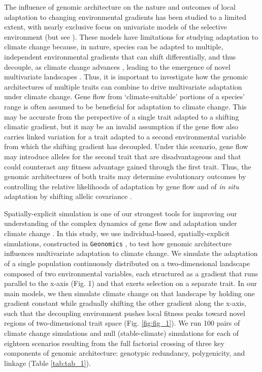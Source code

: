 \documentclass[9pt,twocolumn,twoside,lineno]{new_article}
\begin{document}
The influence of genomic architecture on the nature and outcomes
of local adaptation to changing environmental gradients
has been studied to a limited extent,
with nearly exclusive focus on univariate models
of the selective environment (but see \cite{schiffers}).
These models have limitations for studying adaptation to climate change
because, in nature, species can be adapted to multiple,
independent environmental gradients \cite{guillaume} that can shift differentially,
and thus decouple, as climate change advances
\cite{crimmins,daly},
leading to the emergence of novel multivariate landscapes
\cite{williams_novel_climates,williams_projected_novel_disappearing,fitzpatrick}.
Thus, it is important to investigate how the genomic architectures
of multiple traits can combine to drive multivariate adaptation under climate change.
Gene flow from `climate-suitable' portions of a species' range
is often assumed to be beneficial for adaptation to climate change.
This may be accurate from the perspective of a single trait
adapted to a shifting climatic gradient, but it may be
an invalid assumption if the gene flow also carries
linked variation for a trait
adapted to a second environmental variable
from which the shifting gradient has decoupled.
Under this scenario, gene flow may introduce alleles for the second trait
that are disadvantageous and that could counteract any fitness advantage
gained through the first trait.
Thus, the genomic architectures of both traits
may determine evolutionary outcomes
by controlling the relative likelihoods of adaptation by gene flow
and of \textit{in situ} adaptation by shifting
allelic covariance
\cite{aitken_whitlock,schiffers}.

Spatially-explicit simulation is one of our strongest tools
for improving our understanding of the complex dynamics of gene flow and adaptation
under climate change \cite{capblancq_review}.
In this study, we use individual-based, spatially-explicit simulations,
constructed in \texttt{Geonomics} \cite{terasaki_hart},
to test how genomic architecture influences multivariate adaptation to climate change.
We simulate the adaptation of a single population
continuously distributed on a two-dimensional landscape composed of two environmental
variables, each structured as a gradient that runs parallel to the x-axis (Fig. 1) and that exerts selection on a separate trait.
In our main models, we then simulate climate change on that landscape by holding one gradient 
constant while gradually shifting the other gradient along the x-axis, such that
the decoupling environment pushes local fitness peaks toward novel regions 
of two-dimensional trait space (Fig. \ref{fig:fig_1}).
We run 100 pairs of climate change simulations
and null (stable-climate) simulations for each of eighteen scenarios
resulting from the full factorial crossing of three key components
of genomic architecture: genotypic redundancy, polygenicity, and linkage
(Table \ref{tab:tab_1}).
\end{document}
